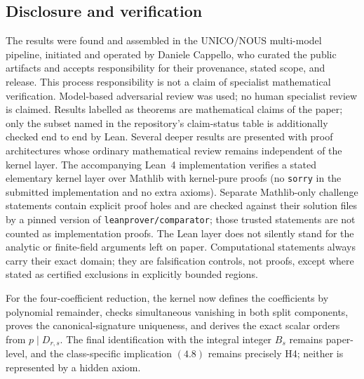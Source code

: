 \documentclass[11pt]{amsart}
\theoremstyle{definition}
\theoremstyle{remark}
\begin{document}
\subsection*{Disclosure and verification}
The results were found and assembled in the UNICO/NOUS multi-model pipeline,
initiated and operated by Daniele Cappello, who curated the public artifacts
and accepts responsibility for their provenance, stated scope, and release.
This process responsibility is not a claim of specialist mathematical
verification. Model-based adversarial review was used; no human specialist
review is claimed. Results labelled
as theorems are mathematical claims of the paper; only the subset named in
the repository's claim-status table is additionally checked end to end by
Lean. Several deeper results are presented with proof architectures whose
ordinary mathematical review remains independent of the kernel layer. The
accompanying Lean~4 implementation verifies a stated elementary kernel
layer over Mathlib with kernel-pure proofs (no
\texttt{sorry} in the submitted implementation and no extra axioms).
Separate Mathlib-only challenge statements contain explicit proof holes and
are checked against their solution files by a pinned version of
\texttt{leanprover/comparator}; those trusted statements are not counted as
implementation proofs. The Lean layer does not silently stand for the
analytic or finite-field arguments left on paper. Computational statements
always carry their exact domain; they are
falsification controls, not proofs, except where stated as certified
exclusions in explicitly bounded regions.

For the four-coefficient reduction, the kernel now defines the
coefficients by polynomial remainder, checks simultaneous vanishing in
both split components, proves the canonical-signature uniqueness, and
derives the exact scalar orders from \(p\mid D_{r,s}\).  The final
identification with the integral integer \(B_s\) remains paper-level,
and the class-specific implication \((4.8)\) remains precisely H4; neither
is represented by a hidden axiom.
\end{document}
